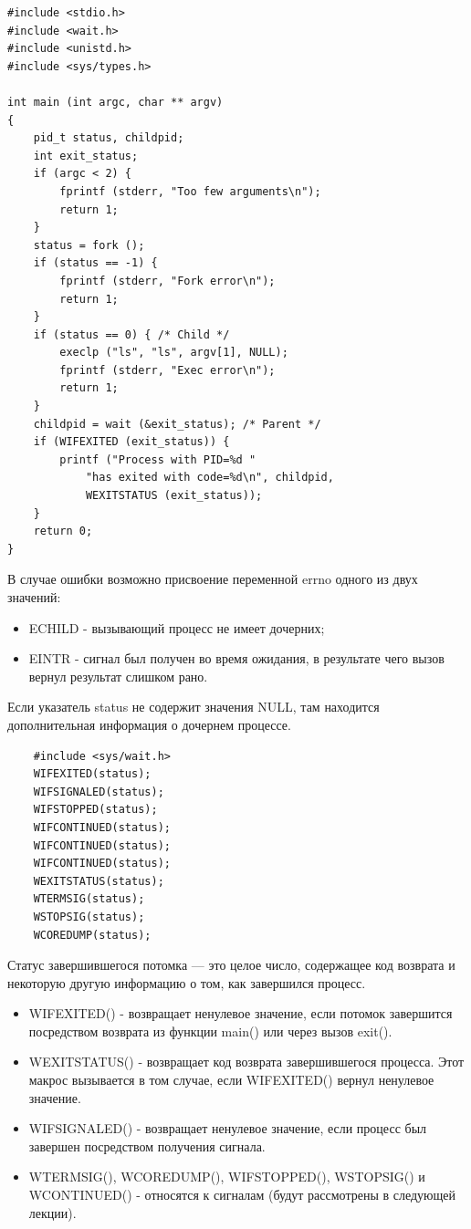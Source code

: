 \documentclass[xcolor=table]{beamer}
\begin{document}
\begin{frame}
	\begin{verbatim}
#include <stdio.h>
#include <wait.h>
#include <unistd.h>
#include <sys/types.h>

int main (int argc, char ** argv)
{
    pid_t status, childpid;   
    int exit_status;    
    if (argc < 2) {
        fprintf (stderr, "Too few arguments\n");
        return 1;
    }
    status = fork ();
    if (status == -1) {
        fprintf (stderr, "Fork error\n");
        return 1;
    }    
    if (status == 0) { /* Child */
        execlp ("ls", "ls", argv[1], NULL);
        fprintf (stderr, "Exec error\n");
        return 1;
    }    
    childpid = wait (&exit_status); /* Parent */
    if (WIFEXITED (exit_status)) {
        printf ("Process with PID=%d "
            "has exited with code=%d\n", childpid,
            WEXITSTATUS (exit_status));
    } 
    return 0;
}
	\end{verbatim}
\end{frame}

\begin{frame}
	В случае ошибки возможно присвоение переменной errno одного из двух значений:
	\begin{itemize}
		\item ECHILD - вызывающий процесс не имеет дочерних;
		\item EINTR - сигнал был получен во время ожидания, в результате чего вызов вернул результат слишком рано.
	\end{itemize}
	Если указатель status не содержит значения NULL, там находится дополнительная информация о дочернем процессе. 
	\begin{verbatim}
	#include <sys/wait.h>	
	WIFEXITED(status);
	WIFSIGNALED(status);
	WIFSTOPPED(status);
	WIFCONTINUED(status);
	WIFCONTINUED(status);	
	WIFCONTINUED(status);
	WEXITSTATUS(status);	
	WTERMSIG(status);		
	WSTOPSIG(status);			
	WCOREDUMP(status);
	\end{verbatim}
\end{frame}

\begin{frame}
	Статус завершившегося потомка — это целое число, содержащее код возврата и некоторую другую информацию о том, как завершился процесс.
	\begin{itemize}
		\item WIFEXITED() - возвращает ненулевое значение, если потомок завершится посредством возврата из функции main() или через вызов exit().
		\item WEXITSTATUS() - возвращает код возврата завершившегося процесса. Этот макрос вызывается в том случае, если WIFEXITED() вернул ненулевое значение.
		\item WIFSIGNALED() - возвращает ненулевое значение, если процесс был завершен посредством получения сигнала. 
		\item WTERMSIG(), WCOREDUMP(), WIFSTOPPED(), WSTOPSIG() и WCONTINUED() - относятся к сигналам (будут рассмотрены в следующей лекции).
	\end{itemize}	
\end{frame}
\end{document}
